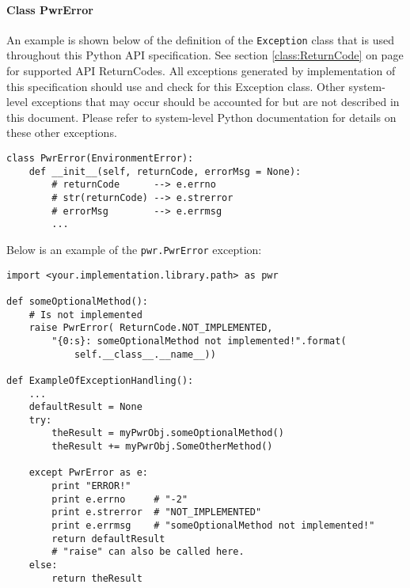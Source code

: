 \documentclass[12pt]{report} %
\begin{document}
\begin{appendices}
\paragraph{Class PwrError} \label{class:PwrError}

An example is shown below of the definition of the
\texttt{Exception} class that is used throughout this
Python API specification. See section \ref{class:ReturnCode} on page
\pageref{class:ReturnCode} for supported API ReturnCodes. All exceptions
generated by implementation of this specification should use and check for this
Exception class. Other system-level exceptions that may occur should be
accounted for but are not described in this document. Please refer to
system-level Python documentation for details on these other exceptions.

\begin{center}\begin{minipage}{.95\linewidth}\begin{lstlisting}
class PwrError(EnvironmentError):
    def __init__(self, returnCode, errorMsg = None):
        # returnCode      --> e.errno
        # str(returnCode) --> e.strerror
        # errorMsg        --> e.errmsg
        ...
\end{lstlisting}\end{minipage}\end{center}

Below is an example of the \texttt{pwr.PwrError} exception:

\begin{center}\begin{minipage}{.95\linewidth}\begin{lstlisting}
import <your.implementation.library.path> as pwr

def someOptionalMethod():
    # Is not implemented
    raise PwrError( ReturnCode.NOT_IMPLEMENTED,
        "{0:s}: someOptionalMethod not implemented!".format(
            self.__class__.__name__))

def ExampleOfExceptionHandling():
    ...
    defaultResult = None
    try:
        theResult = myPwrObj.someOptionalMethod()
        theResult += myPwrObj.SomeOtherMethod()

    except PwrError as e:
        print "ERROR!"
        print e.errno     # "-2"
        print e.strerror  # "NOT_IMPLEMENTED"
        print e.errmsg    # "someOptionalMethod not implemented!"
        return defaultResult
        # "raise" can also be called here.
    else:
        return theResult
\end{lstlisting}\end{minipage}\end{center}


\end{appendices}
\end{document}
